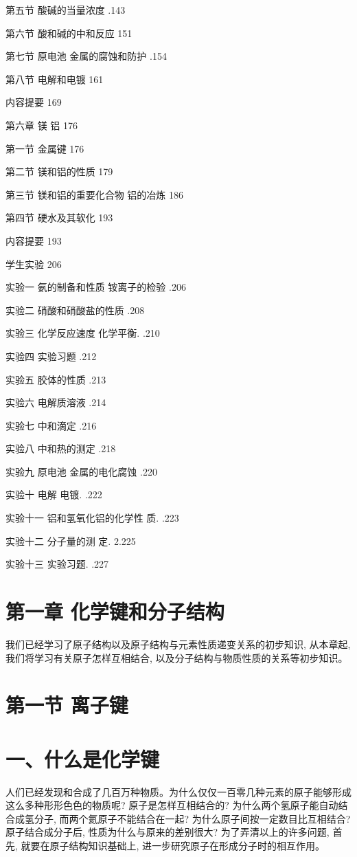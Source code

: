\documentclass[10pt]{article}
\begin{document}
第五节 酸碱的当量浓度 .143

第六节 酸和碱的中和反应 151

第七节 原电池 金属的腐蚀和防护 .154

第八节 电解和电镀 161

内容提要 169

第六章 镁 铝 176

第一节 金属键 176

第二节 镁和铝的性质 179

第三节 镁和铝的重要化合物 铝的冶炼 186

第四节 硬水及其软化 193

内容提要 193

学生实验 206

实验一 氨的制备和性质 铵离子的检验 .206

实验二 硝酸和硝酸盐的性质 .208

实验三 化学反应速度 化学平衡. .210

实验四 实验习题 .212

实验五 胶体的性质 .213

实验六 电解质溶液 .214

实验七 中和滴定 .216

实验八 中和热的测定 .218

实验九 原电池 金属的电化腐蚀 .220

实验十 电解 电镀. .222

实验十一 铝和氢氧化铝的化学性 质. .223

实验十二 分子量的测 定. 2.225

实验十三 实验习题. .227

\section*{第一章 化学键和分子结构}

我们已经学习了原子结构以及原子结构与元素性质递变关系的初步知识, 从本章起, 我们将学习有关原子怎样互相结合, 以及分子结构与物质性质的关系等初步知识。

\section*{第一节 离子键}

\section*{一、什么是化学键}

人们已经发现和合成了几百万种物质。为什么仅仅一百零几种元素的原子能够形成这么多种形形色色的物质呢? 原子是怎样互相结合的? 为什么两个氢原子能自动结合成氢分子, 而两个氦原子不能结合在一起? 为什么原子间按一定数目比互相结合? 原子结合成分子后, 性质为什么与原来的差别很大? 为了弄清以上的许多问题, 首先, 就要在原子结构知识基础上, 进一步研究原子在形成分子时的相互作用。
\end{document}
